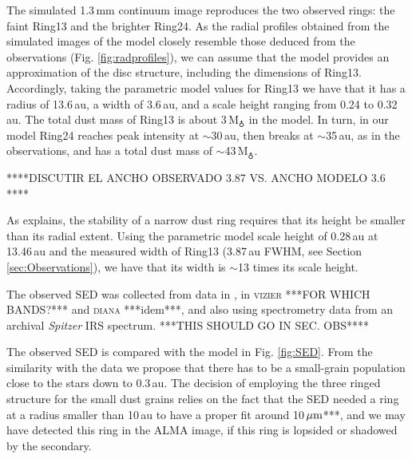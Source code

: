 \documentclass[letters,usenatbib,times]{mnras}
\begin{document}
The simulated 1.3\,mm continuum image  reproduces the two observed rings: the faint Ring13 and the  brighter Ring24. As the radial profiles obtained from the simulated images of the model closely resemble those deduced from the observations (Fig. \ref{fig:radprofiles}), we can assume that the model provides an approximation of the disc structure, including the dimensions of  Ring13. Accordingly, taking the parametric model values for Ring13 we have that it has a radius of  13.6\,au,  a  width of 3.6\,au, and a  scale height ranging from 0.24 to 0.32\,au. The total dust mass of Ring13 is  about 3\,M$_{\earth}$ in the model.  In turn, in our model Ring24 reaches peak intensity at $\sim$30\,au, then  breaks  at $\sim$35\,au, as in the observations, and has a total dust  mass of $\sim$43\,M$_{\earth}$. 

****DISCUTIR EL ANCHO OBSERVADO 3.87 VS. ANCHO MODELO 3.6 **** 

As \citet{2018ApJ...869L..46D} explains, the stability of a narrow dust ring requires that its  height be smaller than its  radial extent. Using the parametric model scale height of 0.28\,au at 13.46\,au and the measured width of Ring13 (3.87\,au FWHM, see Section \ref{sec:Observations}), we have that its width is $\sim$13 times its scale height.

The observed SED was collected from data  in \citet{Jensen_97}, in \textsc{vizier} ***FOR WHICH BANDS?***  and \textsc{diana} ***idem***, and also using spectrometry data from an archival \textit{Spitzer} IRS spectrum.   ***THIS SHOULD GO IN SEC. OBS**** 

The observed SED is compared with the model in Fig. \ref{fig:SED}. From the similarity with the data we propose that there has to be a small-grain population close to the stars down to 0.3\,au. The decision of employing the three ringed structure for the small dust grains relies on the fact that the SED needed a ring at a radius smaller than 10\,au to have a proper fit around 10\,$\hbox{$\mu$m}$***, and we may have detected this ring in the ALMA image, if this ring is lopsided or shadowed by the secondary. 
\end{document}
